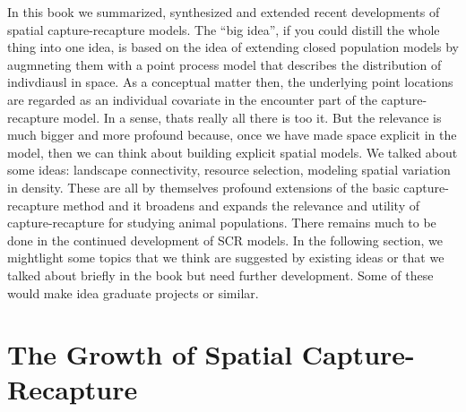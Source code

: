 In this book we summarized, synthesized and extended recent
developments of spatial capture-recapture models.  The ``big idea'',
if you could distill the whole thing into one idea, is based on the
 idea of extending closed population models by augmneting them with a
 point process model that describes the distribution of indivdiausl \citep{efford;2004} in
 space. As a conceptual matter then, the underlying point locations
 are regarded as an individual covariate in the encounter part of the
 capture-recapture model. In a sense, thats really all there is too
 it. But the relevance is much bigger and more profound because, once
 we have made space explicit in the model, then we can think about
 building explicit spatial models.
We talked about some ideas: landscape connectivity, resource
selection, modeling spatial variation in density. These are all by
themselves profound extensions of the basic capture-recapture method
and it broadens and expands the relevance and utility of
capture-recapture for studying animal populations.  
There remains much to be done in the continued development of SCR
models. In the following section, we mightlight some topics that we
think are suggested by existing ideas or that we talked about briefly
in the book but need further development. Some of these would make
idea graduate projects or similar.


\section{The Growth of Spatial Capture-Recapture}

